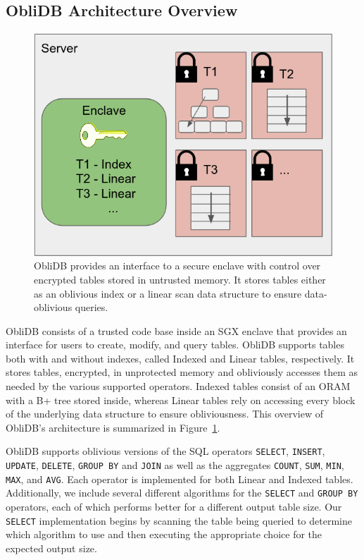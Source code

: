 \documentclass[letterpaper,twocolumn,10pt]{article}
\def\name/{ObliDB}
\begin{document}
\subsection{\name/ Architecture Overview}
\begin{figure}
\includegraphics[width=\linewidth]{figure_server.png}
\caption{\name/ provides an interface to a secure enclave with control over encrypted tables stored in untrusted memory. It stores tables either as an oblivious index or a linear scan data structure to ensure data-oblivious queries.}
\label{arch}
\end{figure}
\name/ consists of a trusted code base inside an SGX enclave that provides an interface for users to create, modify, and query tables. \name/ supports tables both with and without indexes, called Indexed and Linear tables, respectively. It stores tables, encrypted, in unprotected memory and obliviously accesses them as needed by the various supported operators. Indexed tables consist of an ORAM with a B+ tree stored inside, whereas Linear tables rely on accessing every block of the underlying data structure to ensure obliviousness. This overview of \name/'s architecture is summarized in Figure~\ref{arch}.

  \name/ supports oblivious versions of the SQL operators \texttt{SELECT}, \texttt{INSERT}, \texttt{UPDATE}, \texttt{DELETE}, \texttt{GROUP BY} and \texttt{JOIN} as well as the aggregates \texttt{COUNT}, \texttt{SUM}, \texttt{MIN}, \texttt{MAX}, and \texttt{AVG}. Each operator is implemented for both Linear and Indexed tables. Additionally, we include several different algorithms for the \texttt{SELECT} and \texttt{GROUP BY} operators, each of which performs better for a different output table size. Our \texttt{SELECT} implementation begins by scanning the table being queried to determine which algorithm to use and then executing the appropriate choice for the expected output size. 
\end{document}
